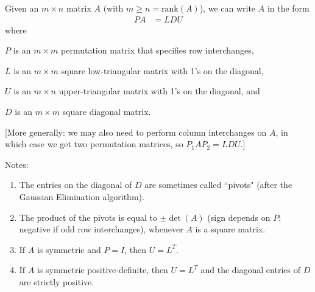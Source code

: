 Given an $m\times n$ matrix $A$ (with $m \geq n = \text{rank}(A)$), we can write $A$ in the form 
\begin{align*}
    PA &= LDU
\end{align*}
where 
\begin{description}
    \item \quad $P$ is an $m\times m$ permutation matrix that specifies row interchanges, 
    \item \quad $L$ is an $m\times m$ square low-triangular matrix with 1's on the diagonal, 
    \item \quad $U$ is an $m\times n$ upper-triangular matrix with 1's on the diagonal, and 
    \item \quad $D$ is an $m\times m$ square diagonal matrix.
\end{description}

[More generally: we may also need to perform column interchanges on $A$, in which case we get two permutation matrices, so $P_1AP_2 = LDU$.]

Notes:
\begin{enumerate}
    \item The entries on the diagonal of $D$ are sometimes called ``pivots" (after the Gaussian Elimination algorithm). 
    \item The product of the pivots is equal to $\pm\det(A)$ (sign depends on $P$; negative if odd row interchanges), whenever $A$ is a square matrix.
    \item If $A$ is symmetric and $P=I$, then $U=L^T$.
    \item If $A$ is symmetric positive-definite, then $U=L^T$ and the diagonal entries of $D$ are strictly positive.
\end{enumerate}

